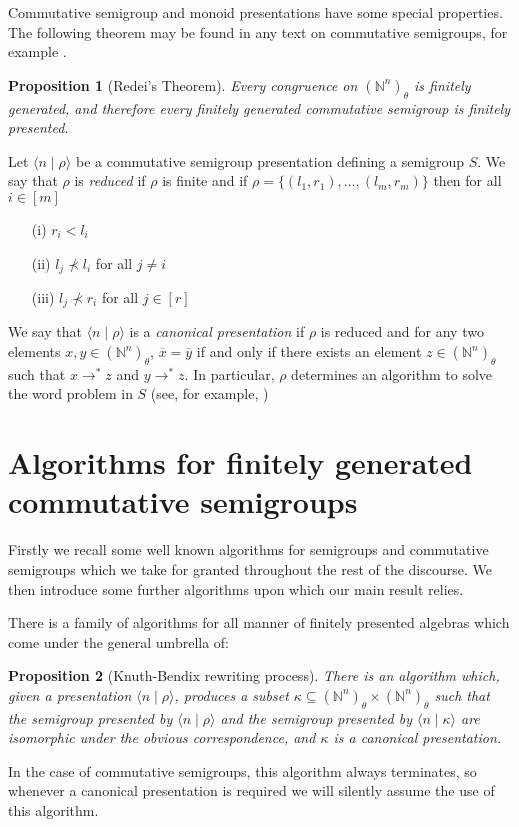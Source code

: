 \documentclass{acmconf}
\def\N{{\mathbb{N}}}
\newtheorem{proposition}{Proposition}
\begin{document}
Commutative semigroup and monoid presentations have some special properties.
The following theorem may be found in any text on commutative semigroups, for
example \cite{bRG99}.
\begin{proposition}[Redei's Theorem]\label{Redei}
Every congruence on $(\N^n)_\theta$ is finitely generated, and therefore
every finitely generated commutative semigroup is finitely presented.
\end{proposition}

Let $\langle n\mid\rho\rangle$ be a 
commutative semigroup presentation defining a semigroup $S$.
We say that $\rho$ is \emph{reduced} if $\rho$ is finite and if
$\rho=\{(l_1,r_1),\ldots,(l_m,r_m)\}$ 
then for all $i\in [m]$
\begin{itemize}
\item[(i)]
$r_i<l_i$
\item[(ii)]
$l_j\nprec l_i$ for all $j\neq i$
\item[(iii)]
$l_j\nprec r_i$ for all $j\in[r]$
\end{itemize} 
We say that $\langle n\mid\rho\rangle$ is a \emph{canonical presentation} 
if $\rho$ is reduced and for any two elements
$x,y\in(\mathbb{N}^n)_{\theta}$, $\overline{x}=\overline{y}$ if and 
only if there exists an element $z\in(\mathbb{N}^n)_{\theta}$ such
that $x\rightarrow^*z$ and $y\rightarrow^*z$.
In particular, $\rho$ determines an algorithm to solve the word
problem in $S$ (see, for example, \cite{bRG99})


\section{Algorithms for finitely generated commutative semigroups}
Firstly we recall some well known algorithms for semigroups and commutative
semigroups which we take for granted throughout the rest of the discourse.
We then introduce some further algorithms upon which our main 
result relies.

There is a family of algorithms for all manner of finitely presented 
algebras which come under the general umbrella of:
\begin{proposition}[Knuth-Bendix rewriting process]
There is an algorithm which, given a presentation  
$\langle n  \mid \rho \rangle$,
produces a  subset $\kappa \subseteq 
(\N^n)_\theta \times (\N^n)_\theta$ such that 
the semigroup presented by $\langle n  \mid \rho \rangle$ and
the semigroup presented by $\langle n  \mid \kappa \rangle$ 
are isomorphic under the obvious correspondence,
and $\kappa$ is a canonical presentation.
\end{proposition}
In the case of commutative semigroups, this algorithm always terminates, so
whenever a canonical presentation is required we will silently assume the use
of this algorithm.
\end{document}
